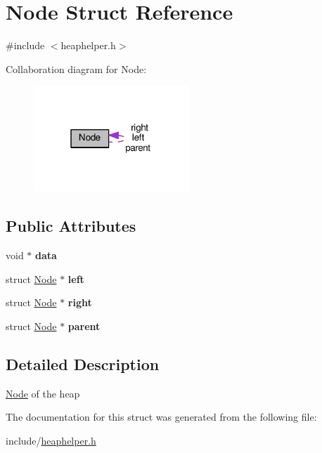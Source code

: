 \hypertarget{structNode}{}\section{Node Struct Reference}
\label{structNode}


{\ttfamily \#include $<$heaphelper.\+h$>$}



Collaboration diagram for Node\+:\nopagebreak
\begin{figure}[H]
\begin{center}
\leavevmode
\includegraphics[width=166pt]{structNode__coll__graph}
\end{center}
\end{figure}
\subsection*{Public Attributes}
\begin{DoxyCompactItemize}
\item 
\mbox{\label{structNode_a38b733496e3eff5e0b4fcb11cd9b866a}} 
void $\ast$ {\bfseries data}
\item 
\mbox{\label{structNode_ad0976834843c7618677d22a10c495b36}} 
struct \hyperlink{structNode}{Node} $\ast$ {\bfseries left}
\item 
\mbox{\label{structNode_af99e7102380da88d7c079fa264230cf4}} 
struct \hyperlink{structNode}{Node} $\ast$ {\bfseries right}
\item 
\mbox{\label{structNode_a34f3ab9670c7b70dad8905359a243c92}} 
struct \hyperlink{structNode}{Node} $\ast$ {\bfseries parent}
\end{DoxyCompactItemize}


\subsection{Detailed Description}
\hyperlink{structNode}{Node} of the heap 

The documentation for this struct was generated from the following file\+:\begin{DoxyCompactItemize}
\item 
include/\hyperlink{heaphelper_8h}{heaphelper.\+h}\end{DoxyCompactItemize}
